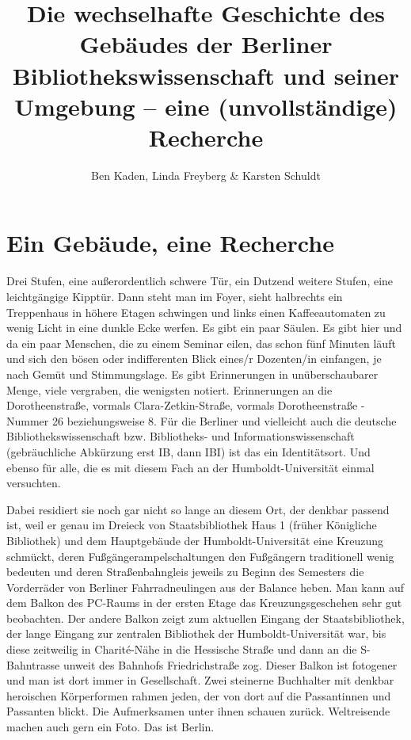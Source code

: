 \documentclass[a4paper,
fontsize=11pt,
oneside,
numbers=noperiodatend,
parskip=half-,
bibliography=totoc,
final
]{scrartcl}
\title{\LARGE{Die wechselhafte Geschichte des Gebäudes der Berliner Bibliothekswissenschaft und seiner Umgebung -- eine (unvollständige) Recherche}}%
\author{Ben Kaden, Linda Freyberg \& Karsten Schuldt} %
\date{}
\begin{document}
\maketitle
\thispagestyle{fancyplain} 


\hypertarget{ein-gebuxe4ude-eine-recherche}{%
\section{Ein Gebäude, eine
Recherche}\label{ein-gebuxe4ude-eine-recherche}}

Drei Stufen, eine außerordentlich schwere Tür, ein Dutzend weitere
Stufen, eine leichtgängige Kipptür. Dann steht man im Foyer, sieht
halbrechts ein Treppenhaus in höhere Etagen schwingen und links einen
Kaffeeautomaten zu wenig Licht in eine dunkle Ecke werfen. Es gibt ein
paar Säulen. Es gibt hier und da ein paar Menschen, die zu einem Seminar
eilen, das schon fünf Minuten läuft und sich den bösen oder
indifferenten Blick eines/r Dozenten/in einfangen, je nach Gemüt und
Stimmungslage. Es gibt Erinnerungen in unüberschaubarer Menge, viele
vergraben, die wenigsten notiert. Erinnerungen an die Dorotheenstraße,
vormals Clara-Zetkin-Straße, vormals Dorotheenstraße - Nummer 26
beziehungsweise 8. Für die Berliner und vielleicht auch die deutsche
Bibliothekswissenschaft bzw. Bibliotheks- und Informationswissenschaft
(gebräuchliche Abkürzung erst IB, dann IBI) ist das ein Identitätsort.
Und ebenso für alle, die es mit diesem Fach an der Humboldt-Universität
einmal versuchten.

Dabei residiert sie noch gar nicht so lange an diesem Ort, der denkbar
passend ist, weil er genau im Dreieck von Staatsbibliothek Haus 1
(früher Königliche Bibliothek) und dem Hauptgebäude der
Humboldt-Universität eine Kreuzung schmückt, deren
Fußgängerampelschaltungen den Fußgängern traditionell wenig bedeuten und
deren Straßenbahngleis jeweils zu Beginn des Semesters die Vorderräder
von Berliner Fahrradneulingen aus der Balance heben. Man kann auf dem
Balkon des PC-Raums in der ersten Etage das Kreuzungsgeschehen sehr gut
beobachten. Der andere Balkon zeigt zum aktuellen Eingang der
Staatsbibliothek, der lange Eingang zur zentralen Bibliothek der
Humboldt-Universität war, bis diese zeitweilig in Charité-Nähe in die
Hessische Straße und dann an die S-Bahntrasse unweit des Bahnhofs
Friedrichstraße zog. Dieser Balkon ist fotogener und man ist dort immer
in Gesellschaft. Zwei steinerne Buchhalter mit denkbar heroischen
Körperformen rahmen jeden, der von dort auf die Passantinnen und
Passanten blickt. Die Aufmerksamen unter ihnen schauen zurück.
Weltreisende machen auch gern ein Foto. Das ist Berlin.
\end{document}
